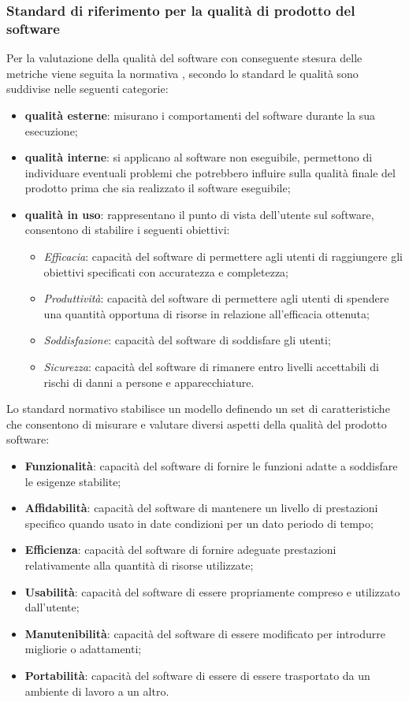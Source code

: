 \subsubsection{Standard di riferimento per la qualità di prodotto del software}
Per la valutazione della qualità del software con conseguente stesura delle metriche viene seguita la normativa , secondo lo standard le qualità sono suddivise nelle seguenti categorie:
\begin{itemize}
    \item \textbf{qualità esterne}: misurano i comportamenti del software durante la sua esecuzione;
    \item \textbf{qualità interne}: si applicano al software non eseguibile, permettono di individuare eventuali problemi che potrebbero influire sulla qualità finale del prodotto prima che sia realizzato il software eseguibile;
    \item \textbf{qualità in uso}: rappresentano il punto di vista dell'utente sul software, consentono di stabilire i seguenti obiettivi:
    \begin{itemize}
        \item \textit{Efficacia}: capacità del software di permettere agli utenti di raggiungere gli obiettivi specificati con accuratezza e completezza;
        \item \textit{Produttività}: capacità del software di permettere agli utenti di spendere una quantità opportuna di risorse in relazione all'efficacia ottenuta;
        \item \textit{Soddisfazione}: capacità del software di soddisfare gli utenti;
        \item \textit{Sicurezza}: capacità del software di rimanere entro livelli accettabili di rischi di danni a persone e apparecchiature.
    \end{itemize}
\end{itemize}
Lo standard normativo stabilisce un modello definendo un set di caratteristiche che consentono di misurare e valutare diversi aspetti della qualità del prodotto software:
\begin{itemize}
    \item \textbf{Funzionalità}: capacità del software di fornire le funzioni adatte a soddisfare le esigenze stabilite;
    \item \textbf{Affidabilità}: capacità del software di mantenere un livello di prestazioni specifico quando usato in date condizioni per un dato periodo di tempo;
    \item \textbf{Efficienza}: capacità del software di fornire adeguate prestazioni relativamente alla quantità di risorse utilizzate;
    \item \textbf{Usabilità}: capacità del software di essere propriamente compreso e utilizzato dall'utente;
    \item \textbf{Manutenibilità}: capacità del software di essere modificato per introdurre migliorie o adattamenti;
    \item \textbf{Portabilità}: capacità del software di essere di essere trasportato da un ambiente di lavoro a un altro.
\end{itemize}
